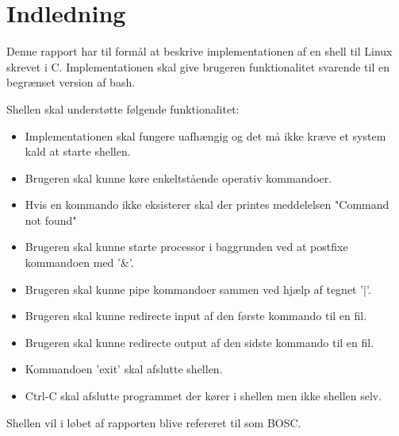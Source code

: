 \section{Indledning}
Denne rapport har til formål at beskrive implementationen af en shell til Linux skrevet i C. Implementationen skal give brugeren funktionalitet svarende til en begrænset version af bash. 

Shellen skal understøtte følgende funktionalitet:
\begin{itemize}
	\item Implementationen skal fungere uafhængig og det må ikke kræve et system kald at starte shellen.
	\item Brugeren skal kunne køre enkeltstående operativ kommandoer.
	\item Hvis en kommando ikke eksisterer skal der printes meddelelsen "Command not found"
	\item Brugeren skal kunne starte processor i baggrunden ved at postfixe kommandoen med '\&'.
	\item Brugeren skal kunne pipe kommandoer sammen ved hjælp af tegnet '|'.
	\item Brugeren skal kunne redirecte input af den første kommando til en fil.
	\item Brugeren skal kunne redirecte output af den sidste kommando til en fil.
	\item Kommandoen 'exit' skal afslutte shellen.
	\item Ctrl-C skal afslutte programmet der kører i shellen men ikke shellen selv.
\end{itemize}

Shellen vil i løbet af rapporten blive refereret til som BOSC.